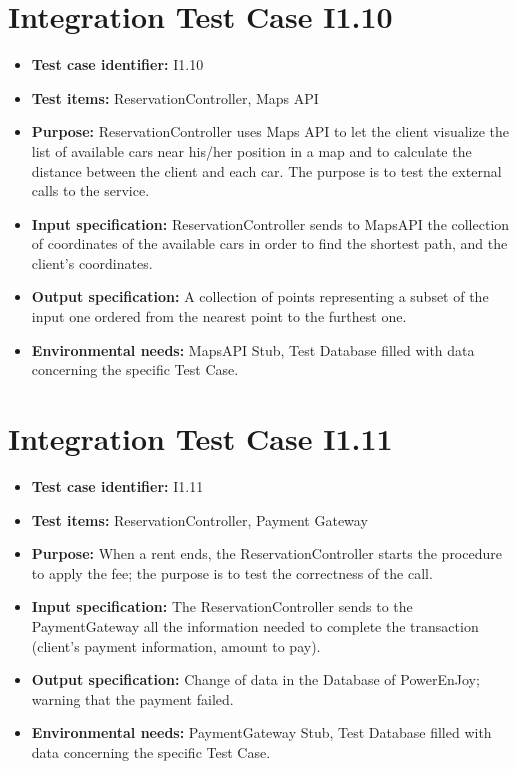 \section{Integration Test Case I1.10}
\begin{itemize}
\item \textbf{Test case identifier:} I1.10
\item \textbf{Test items:} ReservationController, Maps API
\item \textbf{Purpose:} ReservationController uses Maps API to let the client visualize the list of available cars near his/her position in a map and to calculate the distance between the client and each car. The purpose is to test the external calls to the service.
\item \textbf{Input specification:} ReservationController sends to MapsAPI the collection of coordinates of the available cars in order to find the shortest path, and the client’s coordinates.
\item \textbf{Output specification:} A collection of points representing a subset of the input one ordered from the nearest point to the furthest one.
\item \textbf{Environmental needs:} MapsAPI Stub, Test Database filled with data concerning the specific Test Case.
\end{itemize}

\section{Integration Test Case I1.11}
\begin{itemize}
\item \textbf{Test case identifier:} I1.11
\item \textbf{Test items:} ReservationController, Payment Gateway
\item \textbf{Purpose:} When a rent ends, the ReservationController starts the procedure to apply the fee; the purpose is to test the correctness of the call.
\item \textbf{Input specification:} The ReservationController sends to the PaymentGateway all the information needed to complete the transaction (client’s payment information, amount to pay).
\item \textbf{Output specification:} Change of data in the Database of PowerEnJoy; warning that the payment failed.
\item \textbf{Environmental needs:} PaymentGateway Stub, Test Database filled with data concerning the specific Test Case.
\end{itemize}

